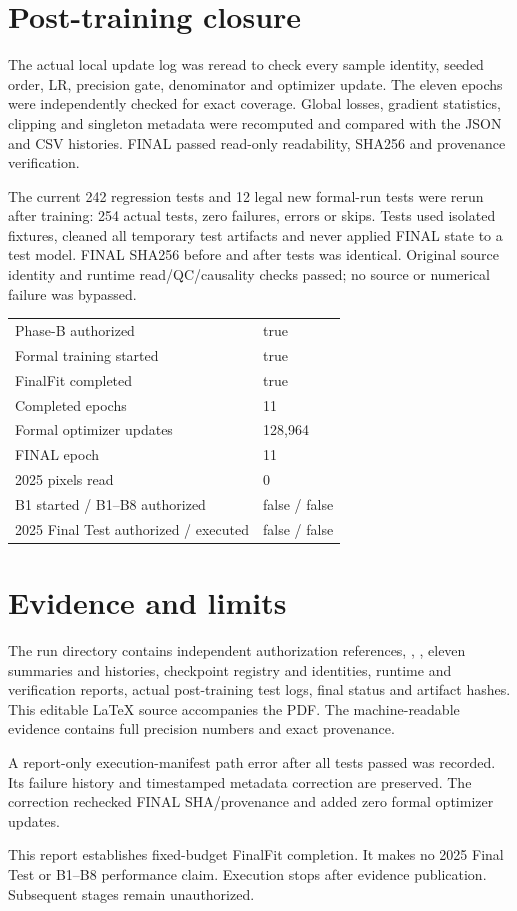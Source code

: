 \documentclass[10pt,a4paper]{article}
\begin{document}
\newpage
\section*{Post-training closure}
The actual local update log was reread to check every sample identity, seeded
order, LR, precision gate, denominator and optimizer update. The eleven
epochs were independently checked for exact coverage. Global losses, gradient
statistics, clipping and singleton metadata were recomputed and compared with
the JSON and CSV histories. FINAL passed read-only readability, SHA256 and
provenance verification.

The current 242 regression tests and 12 legal new formal-run tests
were rerun after training: 254 actual tests, zero failures, errors or
skips. Tests used isolated fixtures, cleaned all temporary test artifacts and
never applied FINAL state to a test model. FINAL SHA256 before and after tests
was identical. Original source identity and runtime read/QC/causality checks
passed; no source or numerical failure was bypassed.

\begin{tabular}{ll}
Phase-B authorized & true\\
Formal training started & true\\
FinalFit completed & true\\
Completed epochs & 11\\
Formal optimizer updates & 128,964\\
FINAL epoch & 11\\
2025 pixels read & 0\\
B1 started / B1--B8 authorized & false / false\\
2025 Final Test authorized / executed & false / false
\end{tabular}

\section*{Evidence and limits}
The run directory contains independent authorization references,
, , eleven summaries
and histories, checkpoint registry and identities, runtime and verification
reports, actual post-training test logs, final status and artifact hashes.
This editable LaTeX source accompanies the PDF. The machine-readable evidence
contains full precision numbers and exact provenance.

A report-only execution-manifest path error after all tests passed was recorded. Its failure history and timestamped metadata correction are preserved. The correction rechecked FINAL SHA/provenance and added zero formal optimizer updates.

This report establishes fixed-budget FinalFit completion. It makes no 2025
Final Test or B1--B8 performance claim. Execution stops after evidence
publication. Subsequent stages remain unauthorized.
\end{document}
